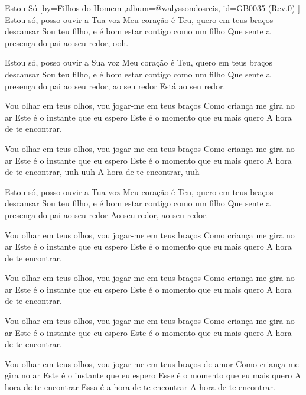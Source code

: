 \beginsong
{Estou Só %
}[by={Filhos do Homem %
},album={@walyssondosreis},
id={GB0035 %
(Rev.0) %
}]
Estou só, posso ouvir a Tua voz
Meu coração é Teu, quero em teus braços descansar
Sou teu filho, e é bom estar contigo como um filho
Que sente a presença do pai ao seu redor, ooh.

Estou só, posso ouvir a Sua voz
Meu coração é Teu, quero em teus braços descansar
Sou teu filho, e é bom estar contigo como um filho
Que sente a presença do pai ao seu redor, ao seu redor
Está ao seu redor.

Vou olhar em teus olhos, vou jogar-me em teus braços
Como criança me gira no ar
Este é o instante que eu espero
Este é o momento que eu mais quero
A hora de te encontrar.

Vou olhar em teus olhos, vou jogar-me em teus braços
Como criança me gira no ar
Este é o instante que eu espero
Este é o momento que eu mais quero
A hora de te encontrar, uuh uuh
A hora de te encontrar, uuh

Estou só, posso ouvir a Tua voz
Meu coração é Teu, quero em teus braços descansar
Sou teu filho, e é bom estar contigo como um filho
Que sente a presença do pai ao seu redor
Ao seu redor, ao seu redor.

Vou olhar em teus olhos, vou jogar-me em teus braços
Como criança me gira no ar
Este é o instante que eu espero
Este é o momento que eu mais quero
A hora de te encontrar.

Vou olhar em teus olhos, vou jogar-me em teus braços
Como criança me gira no ar
Este é o instante que eu espero
Este é o momento que eu mais quero
A hora de te encontrar.

Vou olhar em teus olhos, vou jogar-me em teus braços
Como criança me gira no ar
Este é o instante que eu espero
Este é o momento que eu mais quero
A hora de te encontrar.

Vou olhar em teus olhos, vou jogar-me em teus braços de amor
Como criança me gira no ar
Este é o instante que eu espero
Esse é o momento que eu mais quero
A hora de te encontrar
Essa é a hora de te encontrar
A hora de te encontrar.


